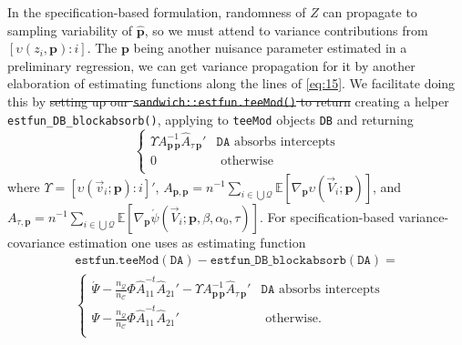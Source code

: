 \documentclass{article}
\newcommand{\absorbInterceptsEF}{\upsilon}
\newcommand{\AbsorbInterceptsEF}{\Upsilon}
\begin{document}
In the specification-based formulation, randomness of $Z$ can propagate to
sampling variability of $\hat{\mathbf{p}}$,  so we must attend to
variance contributions from $[\absorbInterceptsEF(z_{i}, \mathbf{p}): i]$.
The $\mathbf{p}$ being another nuisance parameter estimated in a
preliminary regression, we can get variance propagation for it by
another elaboration of estimating functions along the lines of
\eqref{eq:15}. We facilitate doing
this by \st{setting up our
\texttt{sandwich::estfun.teeMod()} to return} creating a
helper \texttt{estfun\_DB\_blockabsorb()}, applying to
\texttt{teeMod} objects \texttt{DB} and returning
\begin{equation*}
\begin{cases}
  \AbsorbInterceptsEF{}
  A_{\mathbf{p}\,\mathbf{p}}^{-1}\hat{A}_{\tau\,\mathbf{p}}' &
  \mathtt{DA} \text{ absorbs intercepts}\\
0 & \text{ otherwise}\\
\end{cases}
\end{equation*}
where
$\AbsorbInterceptsEF= [\absorbInterceptsEF(\vec{v}_{i}; \mathbf{p}): i]'$,
$A_{\mathbf{p}, \mathbf{p}} = n^{-1}\sum_{i\in \bigcup
  \mathcal{Q}}\mathbb{E} [\nabla_{\mathbf{p}}\absorbInterceptsEF(\vec{V}_{i};
\mathbf{p})]$, and $A_{\tau, \mathbf{p}} = n^{-1} \sum_{i\in \bigcup
  \mathcal{Q}}\mathbb{E}[\nabla_{\mathbf{p}}\acute{\psi}(\vec{V}_{i};
\mathbf{p}, \beta, \alpha_{0}, \tau)]$.  For specification-based variance-covariance
estimation one uses as estimating function
\begin{multline*}\label{eq:25}
  \mathtt{estfun.teeMod(DA)} -
  \mathtt{estfun\_DB\_blockabsorb(DA)} =\\
\begin{cases}
\acute{\Psi} -
  \frac{n_{\mathcal{Q}}}{n_{\mathcal{C}}}\Phi
  \hat{A}_{11}^{-t}\hat{A}_{21}'  - \AbsorbInterceptsEF{}
  A_{\mathbf{p}\,\mathbf{p}}^{-1}\hat{A}_{\tau\,\mathbf{p}}' & \mathtt{DA} \text{ absorbs intercepts}\\
 \Psi -
  \frac{n_{\mathcal{Q}}}{n_{\mathcal{C}}}\Phi
  \hat{A}_{11}^{-t}\hat{A}_{21}'
 & \text{ otherwise}.\\
\end{cases}
\end{multline*}
\end{document}
